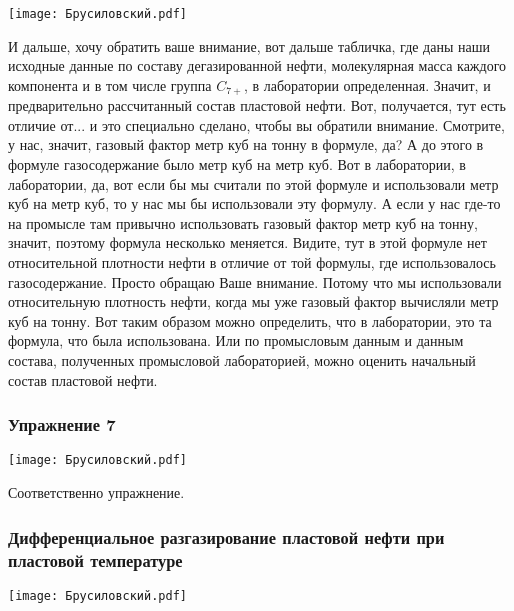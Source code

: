 \documentclass[main.tex]{subfiles}
\begin{document}
\begin{center}
\texttt{[image: Брусиловский.pdf]}
\end{center}

И дальше, хочу обратить ваше внимание, вот дальше табличка, где даны наши исходные данные по составу дегазированной нефти, молекулярная масса каждого компонента и в том числе группа $C_{7+}$, в лаборатории определенная.
Значит, и предварительно рассчитанный состав пластовой нефти.
Вот, получается, тут есть отличие от... и это специально сделано, чтобы вы обратили внимание.
Смотрите, у нас, значит, газовый фактор метр куб на тонну в формуле, да?
А до этого в формуле газосодержание было метр куб на метр куб.
Вот в лаборатории, в лаборатории, да, вот если бы мы считали по этой формуле и использовали метр куб на метр куб, то у нас мы бы использовали эту формулу.
А если у нас где-то на промысле там привычно использовать газовый фактор метр куб на тонну, значит, поэтому формула несколько меняется.
Видите, тут в этой формуле нет относительной плотности нефти в отличие от той формулы, где использовалось газосодержание.
Просто обращаю Ваше внимание.
Потому что мы использовали относительную плотность нефти, когда мы уже газовый фактор вычисляли метр куб на тонну.
Вот таким образом можно определить, что в лаборатории, это та формула, что была использована.
Или по промысловым данным и данным состава, полученных промысловой лабораторией, можно оценить начальный состав пластовой нефти.

\subsubsection{Упражнение 7}

\begin{center}
\texttt{[image: Брусиловский.pdf]}
\end{center}

Соответственно упражнение.

\subsubsection{Дифференциальное разгазирование пластовой нефти при пластовой температуре}

\begin{center}
\texttt{[image: Брусиловский.pdf]}
\end{center}
\end{document}
